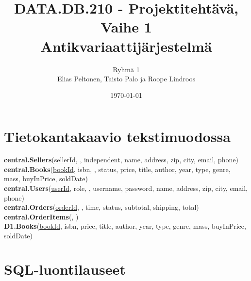 \documentclass[11pt,a4paper]{article}
\title{DATA.DB.210 - Projektitehtävä, Vaihe 1 \\ \large Antikvariaattijärjestelmä}
\author{Ryhmä 1 \\ \small Elias Peltonen, Taisto Palo ja Roope Lindroos}
\date{\today}
\begin{document}
\maketitle

\section*{Tietokantakaavio tekstimuodossa}

\noindent
\textbf{central.Sellers}(\underline{sellerId}, , independent, name, address, zip, city, email, phone) \\[0.5em]
\textbf{central.Books}(\underline{bookId}, isbn, , status, price, title, author, year, type, genre, mass, buyInPrice, soldDate) \\[0.5em]
\textbf{central.Users}(\underline{userId}, role, , username, password, name, address, zip, city, email, phone) \\[0.5em]
\textbf{central.Orders}(\underline{orderId}, , time, status, subtotal, shipping, total) \\[0.5em]
\textbf{central.OrderItems}(, ) \\[0.5em]
\textbf{D1.Books}(\underline{bookId}, isbn, price, title, author, year, type, genre, mass, buyInPrice, soldDate) \\[0.5em]

\section*{SQL-luontilauseet}
\inputminted{sql}{./create.sql}
\end{document}
